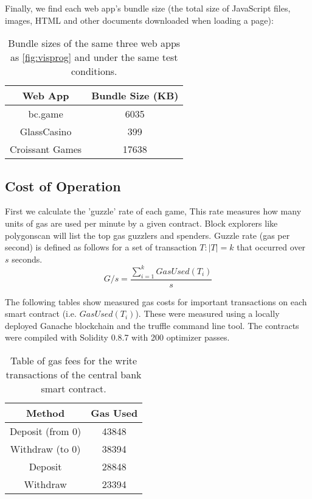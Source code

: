 \documentclass[10pt,journal,compsoc]{IEEEtran}
\begin{document}
Finally, we find each web app's bundle size (the total size of JavaScript files, images, HTML and other documents downloaded when loading a page):

\begin{table}[!h]
    \centering
    \caption{Bundle sizes of the same three web apps as \ref{fig:visprog} and under the same test conditions.}
    \label{tab:bundlesizes}
    \begin{tabular}{c | c}
        \hline\hline
        Web App & Bundle Size (KB) \\ 
        \hline
        bc.game & 6035 \\
        GlassCasino & 399 \\
        Croissant Games & 17638 \\
        \hline\hline
    \end{tabular}
\end{table}

\subsection{Cost of Operation}
First we calculate the 'guzzle' rate of each game, This rate measures how many units of gas are used per minute by a given contract. Block explorers like polygonscan will list the top gas guzzlers and spenders. Guzzle rate (gas per second) is defined as follows for a set of transaction $T : |T| = k$ that occurred over $s$ seconds.
\begin{equation}
    G/s = \frac{\sum_{i=1}^{k} GasUsed(T_{i})}{s}
\end{equation}

The following tables show measured gas costs for important transactions on each smart contract (i.e. $GasUsed(T_i)$). These were measured using a locally deployed Ganache blockchain and the truffle command line tool. The contracts were compiled with Solidity 0.8.7 with 200 optimizer passes.

\begin{table}[!h]
    \centering
    \caption{Table of gas fees for the write transactions of the central bank smart contract.}
    \label{tab:bankgasfees}
    \begin{tabular}{c | c}
        \hline\hline
        Method & Gas Used \\ 
        \hline
        Deposit (from 0) &  43848 \\
        Withdraw (to 0) & 38394 \\
        Deposit & 28848 \\
        Withdraw & 23394 \\
        \hline\hline
    \end{tabular}
\end{table}
\end{document}
